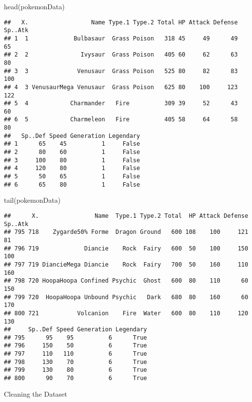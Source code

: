 \documentclass[
]{article}
\newenvironment{Shaded}{\begin{snugshade}}{\end{snugshade}}
\newcommand{\FunctionTok}[1]{\textcolor[rgb]{0.00,0.00,0.00}{#1}}
\newcommand{\NormalTok}[1]{#1}
\begin{document}
\begin{Shaded}
\begin{Highlighting}[]
\FunctionTok{head}\NormalTok{(pokemonData)}
\end{Highlighting}
\end{Shaded}

\begin{verbatim}
##   X.                  Name Type.1 Type.2 Total HP Attack Defense Sp..Atk
## 1  1             Bulbasaur  Grass Poison   318 45     49      49      65
## 2  2               Ivysaur  Grass Poison   405 60     62      63      80
## 3  3              Venusaur  Grass Poison   525 80     82      83     100
## 4  3 VenusaurMega Venusaur  Grass Poison   625 80    100     123     122
## 5  4            Charmander   Fire          309 39     52      43      60
## 6  5            Charmeleon   Fire          405 58     64      58      80
##   Sp..Def Speed Generation Legendary
## 1      65    45          1     False
## 2      80    60          1     False
## 3     100    80          1     False
## 4     120    80          1     False
## 5      50    65          1     False
## 6      65    80          1     False
\end{verbatim}

\begin{Shaded}
\begin{Highlighting}[]
\FunctionTok{tail}\NormalTok{(pokemonData)}
\end{Highlighting}
\end{Shaded}

\begin{verbatim}
##      X.                Name  Type.1 Type.2 Total  HP Attack Defense Sp..Atk
## 795 718    Zygarde50% Forme  Dragon Ground   600 108    100     121      81
## 796 719             Diancie    Rock  Fairy   600  50    100     150     100
## 797 719 DiancieMega Diancie    Rock  Fairy   700  50    160     110     160
## 798 720 HoopaHoopa Confined Psychic  Ghost   600  80    110      60     150
## 799 720  HoopaHoopa Unbound Psychic   Dark   680  80    160      60     170
## 800 721           Volcanion    Fire  Water   600  80    110     120     130
##     Sp..Def Speed Generation Legendary
## 795      95    95          6      True
## 796     150    50          6      True
## 797     110   110          6      True
## 798     130    70          6      True
## 799     130    80          6      True
## 800      90    70          6      True
\end{verbatim}

Cleaning the Dataset
\end{document}
